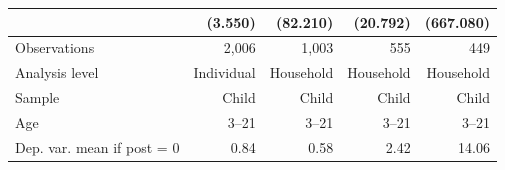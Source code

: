 \begin{center}
\begin{threeparttable}
\begin{tabular}{l*{4}{r}}
                    &     (3.550)&    (82.210)&    (20.792)&   (667.080)\\
\hline
Observations        &       2,006&       1,003&         555&         449\\
Analysis level      &  Individual&   Household&   Household&   Household\\
Sample              &       Child&       Child&       Child&       Child\\
Age                 &       3--21&       3--21&       3--21&       3--21\\
Dep. var. mean if post = 0&        0.84&        0.58&        2.42&       14.06\\
\hline \end{tabular} \end{threeparttable} \end{center}
